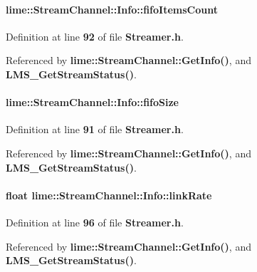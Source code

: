 \paragraph[{fifo\+Items\+Count}]{ lime\+::\+Stream\+Channel\+::\+Info\+::fifo\+Items\+Count}\label{structlime_1_1StreamChannel_1_1Info_a4e56b2f6c66478c7c5103e73bdbf2b4c}


Definition at line {\bf 92} of file {\bf Streamer.\+h}.



Referenced by {\bf lime\+::\+Stream\+Channel\+::\+Get\+Info()}, and {\bf L\+M\+S\+\_\+\+Get\+Stream\+Status()}.

\paragraph[{fifo\+Size}]{ lime\+::\+Stream\+Channel\+::\+Info\+::fifo\+Size}\label{structlime_1_1StreamChannel_1_1Info_abd630cc356ed78add2a71534a6990144}


Definition at line {\bf 91} of file {\bf Streamer.\+h}.



Referenced by {\bf lime\+::\+Stream\+Channel\+::\+Get\+Info()}, and {\bf L\+M\+S\+\_\+\+Get\+Stream\+Status()}.

\paragraph[{link\+Rate}]{\setlength{\rightskip}{0pt plus 5cm}float lime\+::\+Stream\+Channel\+::\+Info\+::link\+Rate}\label{structlime_1_1StreamChannel_1_1Info_a8ca091df521a71c4c275cb33c33894c9}


Definition at line {\bf 96} of file {\bf Streamer.\+h}.



Referenced by {\bf lime\+::\+Stream\+Channel\+::\+Get\+Info()}, and {\bf L\+M\+S\+\_\+\+Get\+Stream\+Status()}.

